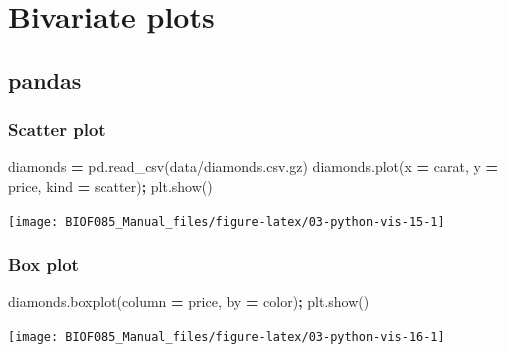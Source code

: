 \documentclass[
  letterpaper,
]{scrbook}
\newenvironment{Shaded}{\begin{snugshade}}{\end{snugshade}}
\newcommand{\NormalTok}[1]{#1}
\newcommand{\OperatorTok}[1]{\textcolor[rgb]{0.81,0.36,0.00}{\textbf{#1}}}
\newcommand{\StringTok}[1]{\textcolor[rgb]{0.31,0.60,0.02}{#1}}
\begin{document}
\hypertarget{bivariate-plots}{%
\section{Bivariate plots}\label{bivariate-plots}}

\hypertarget{pandas-2}{%
\subsection{pandas}\label{pandas-2}}

\hypertarget{scatter-plot}{%
\subsubsection{Scatter plot}\label{scatter-plot}}

\begin{Shaded}
\begin{Highlighting}[]
\NormalTok{diamonds }\OperatorTok{=}\NormalTok{ pd.read\_csv(}\StringTok{\textquotesingle{}data/diamonds.csv.gz\textquotesingle{}}\NormalTok{)}
\NormalTok{diamonds.plot(x }\OperatorTok{=} \StringTok{\textquotesingle{}carat\textquotesingle{}}\NormalTok{, y }\OperatorTok{=} \StringTok{\textquotesingle{}price\textquotesingle{}}\NormalTok{, kind }\OperatorTok{=} \StringTok{\textquotesingle{}scatter\textquotesingle{}}\NormalTok{)}\OperatorTok{;}
\NormalTok{plt.show()}
\end{Highlighting}
\end{Shaded}

\begin{center}\texttt{[image: BIOF085\_Manual\_files/figure-latex/03-python-vis-15-1]} \end{center}

\hypertarget{box-plot}{%
\subsubsection{Box plot}\label{box-plot}}

\begin{Shaded}
\begin{Highlighting}[]
\NormalTok{diamonds.boxplot(column }\OperatorTok{=} \StringTok{\textquotesingle{}price\textquotesingle{}}\NormalTok{, by }\OperatorTok{=} \StringTok{\textquotesingle{}color\textquotesingle{}}\NormalTok{)}\OperatorTok{;}
\NormalTok{plt.show()}
\end{Highlighting}
\end{Shaded}

\begin{center}\texttt{[image: BIOF085\_Manual\_files/figure-latex/03-python-vis-16-1]} \end{center}
\end{document}
